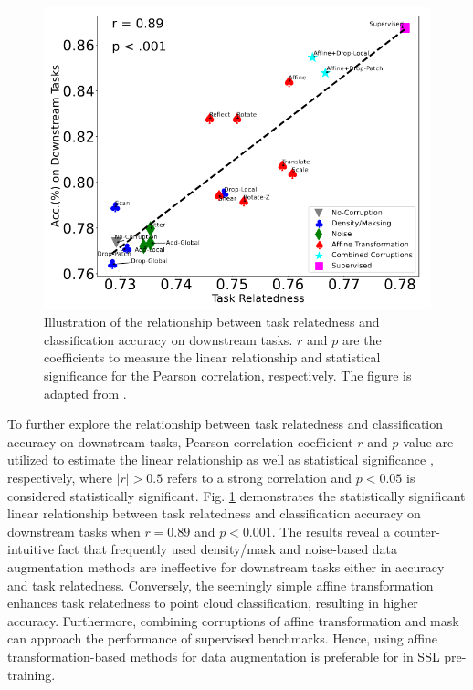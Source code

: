 \documentclass[a4paper,fleqn]{cas-dc}
\begin{document}
\begin{figure}
    \centering
    \includegraphics[width=0.97\linewidth]{task_relatedness.png}
    \caption{Illustration of the relationship between task relatedness and classification accuracy on downstream tasks. $r$ and $p$ are the coefficients to measure the linear relationship and statistical significance for the Pearson correlation, respectively. The figure is adapted from \citep{zhang2022point}.}
    \label{fig:task_relatedness}
\end{figure}

To further explore the relationship between task relatedness and classification accuracy on downstream tasks, Pearson correlation coefficient $r$ and $p$-value are utilized to estimate the linear relationship as well as statistical significance \citep{fraser1976probability}, respectively, where $|r| > 0.5$ refers to a strong correlation and $p < 0.05$ is considered statistically significant. Fig. \ref{fig:task_relatedness} demonstrates the statistically significant linear relationship between task relatedness and classification accuracy on downstream tasks when $r = 0.89$ and $p < 0.001$. The results reveal a counter-intuitive fact that frequently used density/mask and noise-based data augmentation methods are ineffective for downstream tasks either in accuracy and task relatedness. Conversely, the seemingly simple affine transformation enhances task relatedness to point cloud classification, resulting in higher accuracy. Furthermore, combining corruptions of affine transformation and mask can approach the performance of supervised benchmarks. Hence, using affine transformation-based methods for data augmentation is preferable for in SSL pre-training.
\end{document}
